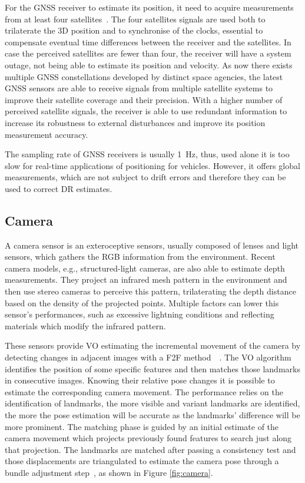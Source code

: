For the \gls{GNSS} receiver to estimate its position, it need to acquire measurements from at least four satellites~\cite{Borre2007}.
The four satellites signals are used both to trilaterate the \gls{3D} position and to synchronise of the clocks, essential to compensate eventual time differences between the receiver and the satellites.
In case the perceived satellites are fewer than four, the receiver will have a system outage, not being able to estimate its position and velocity.
As now there exists multiple \gls{GNSS} constellations developed by distinct space agencies, the latest \gls{GNSS} sensors are able to receive signals from multiple satellite systems to improve their satellite coverage and their precision.
With a higher number of perceived satellite signals, the receiver is able to use redundant information to increase its robustness to external disturbances and improve its position measurement accuracy.

The sampling rate of \gls{GNSS} receivers is usually \SI{1}{Hz}, thus, used alone it is too slow for real-time applications of positioning for vehicles. 
However, it offers global measurements, which are not subject to drift errors and therefore they can be used to correct \gls{DR} estimates.


\subsection{Camera}

\noindent A camera sensor is an exteroceptive sensors, usually composed of lenses and light sensors, which gathers the \gls{RGB} information from the environment.
Recent camera models, e.g., structured-light cameras, are also able to estimate depth measurements. %
They project an infrared mesh pattern in the environment and then use stereo cameras to perceive this pattern, trilaterating the depth distance based on the density of the projected points.
Multiple factors can lower this sensor's performances, such as excessive lightning conditions and reflecting materials which modify the infrared pattern.

These sensors provide \gls{VO} estimating the incremental movement of the camera by detecting changes in adjacent images with a \gls{F2F} method~\cite{camera}~\cite{cameraa}.
The \gls{VO} algorithm identifies the position of some specific features and then matches those landmarks in consecutive images.
Knowing their relative pose changes it is possible to estimate the corresponding camera movement.
The performance relies on the identification of landmarks, the more visible and variant landmarks are identified, the more the pose estimation will be accurate as the landmarks' difference will be more prominent.
The matching phase is guided by an initial estimate of the camera movement which projects previously found features to search just along that projection.
The landmarks are matched after passing a consistency test and those displacements are triangulated to estimate the camera pose through a bundle adjustment step~\cite{robustFusion}, as shown in Figure \ref{fig:camera}.

